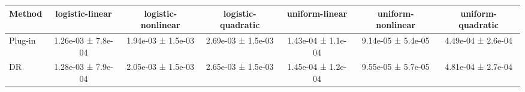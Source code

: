 \begin{tabular}{lcccccc}
\toprule
Method & logistic-linear & logistic-nonlinear & logistic-quadratic & uniform-linear & uniform-nonlinear & uniform-quadratic \\
\midrule
Plug-in & 1.26e-03 ± 7.8e-04 & 1.94e-03 ± 1.5e-03 & 2.69e-03 ± 1.5e-03 & 1.43e-04 ± 1.1e-04 & 9.14e-05 ± 5.4e-05 & 4.49e-04 ± 2.6e-04 \\
DR & 1.28e-03 ± 7.9e-04 & 2.05e-03 ± 1.5e-03 & 2.65e-03 ± 1.5e-03 & 1.45e-04 ± 1.2e-04 & 9.55e-05 ± 5.7e-05 & 4.81e-04 ± 2.7e-04 \\
\bottomrule
\end{tabular}
